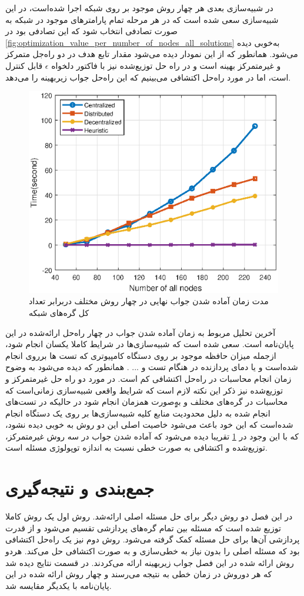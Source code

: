 	در شبیه‌سازی بعدی هر چهار روش موجود بر روی شبکه اجرا شده‌است، در این شبیه‌سازی سعی شده است که در هر مرحله تمام پارامترهای موجود در شبکه به صورت تصادفی انتخاب شود که این تصادفی بود در \cref{fig:optimization_value_per_number_of_nodes_all_solutions} به‌خوبی دیده  می‌شود. همانطور که از این نمودار دیده می‌شود مقدار تابع هدف در دو راه‌جل متمرکز و غیرمتمرکز بهینه است و در راه حل توزیع‌شده نیز با فاکتور دلخواه $\epsilon$ قابل کنترل است، اما در مورد راه‌حل اکتشافی می‌بینیم که این راه‌حل جواب زیربهینه را می‌دهد. 
\begin{figure}[h!]
	\centerline{\includegraphics[width=12cm]{graphics/4-heuristic-dist/time_of_convergence}}
	\caption{مدت زمان آماده شدن جواب نهایی در چهار روش مختلف دربرابر تعداد کل گره‌های شبکه}
	\label{fig:time_of_convergence}
\end{figure}

	آخرین تحلیل مربوط به زمان آماده شدن جواب در چهار راه‌حل ارائه‌شده در این پایان‌نامه است. سعی شده است که شبیه‌سازی‌ها در شرایط کاملا یکسان انجام شود، ازجمله میزان حافظه موجود بر روی دستگاه کامپیوتری که تست ها برروی انجام شده‌است و یا دمای پردازنده در هنگام تست و ... . همانطور که دیده می‌شود به وضوح زمان انجام محاسبات در راه‌حل اکتشافی کم است. در مورد دو راه حل غیرمتمرکز و توزیع‌شده نیز ذکر این نکته لازم است که شرایط واقعی شبیه‌سازی زمانی‌است که محاسبات در گره‌های مختلف و بهٍٍ‌صورت همزمان انجام شود در حالیکه در تست‌های انجام شده به دلیل محدودیت منابع کلیه شبیه‌سازی‌ها بر روی یک دستگاه انجام شده‌است که این خود باعث می‌شود خاصیت اصلی این دو روش به خوبی دیده نشود، که با این وجود در \cref{fig:time_of_convergence} تقریبا دیده می‌شود که آماده شدن جواب در سه روش غیرمتمرکز، توزیع‌شده و اکتشافی به صورت خطی نسبت به اندازه توپولوژی مسئله است.
	
	\section{جمع‌بندی و نتیجه‌گیری}
	در این فصل دو روش دیگر برای حل مسئله اصلی ارائه‌شد. روش اول یک روش کاملا توزیع شده است که مسئله بین تمام گره‌های پردازشی تقسیم می‌شود و از قدرت پردازشی آن‌ها برای حل مسئله کمک گرفته می‌شود. روش دوم نیز یک راه‌حل اکتشافی بود که مسئله اصلی را بدون نیاز به خطی‌سازی و به صورت اکتشافی حل می‌کند. هردو روش ارائه شده در این فصل جواب زیر‌بهینه ارائه می‌کردند. 
	در قسمت نتایج دیده شد که هر دوروش در زمان خطی به نتیجه می‌رسند و چهار روش ارائه شده در این پایان‌نامه با یکدیگر مقایسه شد. 

